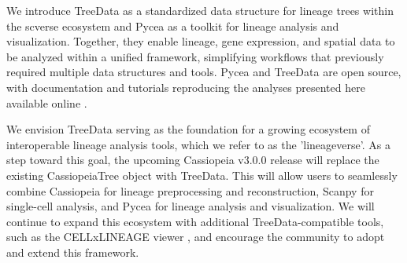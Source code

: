 We introduce TreeData as a standardized data structure for lineage trees within the scverse ecosystem and Pycea as a toolkit for lineage analysis and visualization. Together, they enable lineage, gene expression, and spatial data to be analyzed within a unified framework, simplifying workflows that previously required multiple data structures and tools. Pycea \citep{pycea_github} and TreeData \citep{treedata_github} are open source, with documentation and tutorials reproducing the analyses presented here available online \citep{pycea_docs}.

We envision TreeData serving as the foundation for a growing ecosystem of interoperable lineage analysis tools, which we refer to as the 'lineageverse'. As a step toward this goal, the upcoming Cassiopeia v3.0.0 release will replace the existing CassiopeiaTree object with TreeData. This will allow users to seamlessly combine Cassiopeia for lineage preprocessing and reconstruction, Scanpy for single-cell analysis, and Pycea for lineage analysis and visualization. We will continue to expand this ecosystem with additional TreeData-compatible tools, such as the CELLxLINEAGE viewer \citep{cellxlineage_github}, and encourage the community to adopt and extend this framework.

